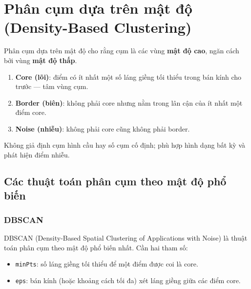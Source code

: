 \section{Phân cụm dựa trên mật độ (Density-Based Clustering)}
\label{sec:density-based}

\begin{dinhnghia}[title={Ý tưởng phân cụm theo mật độ}]
Phân cụm dựa trên mật độ cho rằng cụm là các vùng \textbf{mật độ cao}, ngăn cách bởi vùng \textbf{mật độ thấp}.
\end{dinhnghia}

\begin{phuongphap}[title={Ba loại điểm}]
\begin{enumerate}
  \item \textbf{Core (lõi)}: điểm có ít nhất một số láng giềng tối thiểu trong bán kính cho trước --- tâm vùng cụm.
  \item \textbf{Border (biên)}: không phải core nhưng nằm trong lân cận của ít nhất một điểm core.
  \item \textbf{Noise (nhiễu)}: không phải core cũng không phải border.
\end{enumerate}
\end{phuongphap}

\begin{ynghia}[title={So với centroid/partition}]
Không giả định cụm hình cầu hay số cụm cố định; phù hợp hình dạng bất kỳ và phát hiện điểm nhiễu.
\end{ynghia}

\subsection{Các thuật toán phân cụm theo mật độ phổ biến}

\subsubsection{DBSCAN}

\begin{dinhnghia}[title={DBSCAN}]
DBSCAN (Density-Based Spatial Clustering of Applications with Noise) là thuật toán phân cụm theo mật độ phổ biến nhất. Cần hai tham số:
\begin{itemize}
  \item \texttt{minPts}: số láng giềng tối thiểu để một điểm được coi là core.
  \item \texttt{eps}: bán kính (hoặc khoảng cách tối đa) xét láng giềng giữa các điểm core.
\end{itemize}
\end{dinhnghia}

